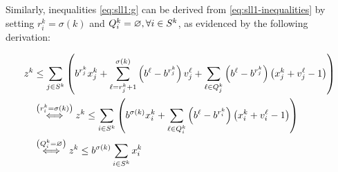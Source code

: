 Similarly, inequalities \eqref{eq:sll1:g} can be derived from
\eqref{eq:sll1-inequalities} by setting $r_i^k = \sigma(k)$ and $Q_i^k =
\varnothing, \forall{\ensuremath{i \in S^k}}$, as evidenced by the following derivation:

\begin{eqnarray*}
    z^k&\leq \sum_{j \in S^k} \left(
            b^{r_j^k}x_j^k
            + \sum_{\ell = r_j^k + 1}^{\sigma\left(k\right)} \left(b^\ell - b^{r_j^k}\right) v_j^\ell
            + \sum_{\ell \in Q_j^k} \left(b^\ell - b^{r_j^k}\right) \left(x_j^k + v_j^\ell - 1\right)
        \right)\\
       &\stackrel{\left(r_i^k = \sigma\left(k\right)\right)}{\iff} z^k \leq
           \sum_{i \in S^k} \left(
               b^{\sigma\left(k\right)} x_i^k
               + \sum_{\ell \in Q_i^k} \left(b^\ell - b^{r_i^k}\right)\left(x_i^k + v_i^\ell-1\right)
           \right)\\
       &\stackrel{\left(Q_i^k = \varnothing\right)}{\iff} z^k \leq
           b^{\sigma\left(k\right)} \sum_{i \in S^k} x_i^k
\end{eqnarray*}
